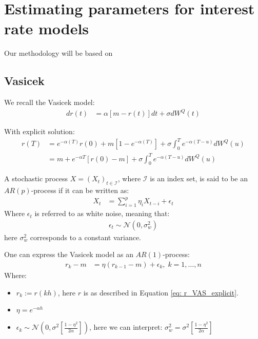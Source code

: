 \chapter{Estimating parameters for interest rate models} 

Our methodology will be based on \cite{remillard2013statistical}

\section{Vasicek}
We recall the Vasicek model: 
\begin{align*}
dr(t) &= \alpha[m - r(t)]dt + \sigma dW^{Q}(t)    
\end{align*}

With explicit solution:
\begin{align}
\label{eq: r_VAS_explicit}
r(T) &= e^{-\alpha(T)}r(0) + m[1-e^{-\alpha(T)}] 
+ \sigma \int_{0}^{T}e^{-\alpha(T-u)}dW^{Q}(u) \nonumber \\ 
&= 
m + e^{-\alpha T}\left[r(0) -m \right]
+ \sigma \int_{0}^{T}e^{-\alpha(T-u)}dW^{Q}(u)
\end{align} 

\begin{definition}
A stochastic process $X = (X_{t})_{t \in \mathcal{I}}$, where $\mathcal{I}$ is an index set, is said to be an $AR(p)$-process if it can be written as:
\begin{align*}
X_{t} &= \sum_{i=1}^{p}\eta_{i}X_{t-i} + \epsilon_{t} 
\end{align*}
Where $\epsilon_{t}$ is referred to as white noise, meaning that: 
\begin{align*}
\epsilon_{t} \sim \mathcal{N}\left(
0, \sigma_{w}^{2}
\right)    
\end{align*}
here $\sigma_{w}^{2}$ corresponds to a constant variance. 
\end{definition} 

\begin{proposition}
One can express the Vasicek model as an $AR(1)$-process: 
\begin{align*}
r_{k}-m &= \eta (r_{k-1}-m) + \epsilon_{k}, \; k = 1, \dots, n     
\end{align*}
Where:
\begin{itemize}[leftmargin =*]
    \item $r_{k} := r(kh)$, here $r$ is as described in Equation \ref{eq: r_VAS_explicit}.
    \item $\eta = e^{-\alpha h}$
    \item $\epsilon_{k} \sim \mathcal{N}\left(
    0, \sigma^{2}\left[
    \frac{1-\eta^{2}}{2\alpha}
    \right]\right)$, here we can interpret: 
    $\sigma_{w}^{2} = \sigma^{2}\left[
    \frac{1-\eta^{2}}{2\alpha}
    \right]$
\end{itemize}
\end{proposition}

